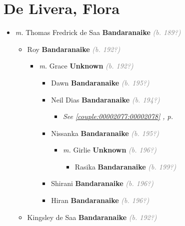 \documentclass[10pt, openany]{book}
\begin{document}
\chapter{De Livera, Flora}
\label{00002372}
\textcolor{slmaroon}{\textit{}}
\begin{itemize}
\item{\textit{m.} Thomas Fredrick de Saa \textbf{Bandaranaike} \textcolor{gray}{\textit{(b. 189?)}}   \label{couple:00002372:00002373} \begin{itemize}
\item{Roy \textbf{Bandaranaike} \textcolor{gray}{\textit{(b. 192?)}}
\begin{itemize}
\item{\textit{m.} Grace \textbf{Unknown} \textcolor{gray}{\textit{(b. 192?)}}   \label{couple:00002377:00002378} \begin{itemize}
\item{Dawn \textbf{Bandaranaike} \textcolor{gray}{\textit{(b. 195?)}}
 }
\item{Neil Dias \textbf{Bandaranaike} \textcolor{gray}{\textit{(b. 194?)}}
\begin{itemize}
\item{\textcolor{slteal}{\textit{See  \autoref{couple:00002077:00002078} \textit{, p. \pageref{couple:00002077:00002078} }}}}
\end{itemize}
  }
\item{Nissanka \textbf{Bandaranaike} \textcolor{gray}{\textit{(b. 195?)}}
\begin{itemize}
\item{\textit{m.} Girlie \textbf{Unknown} \textcolor{gray}{\textit{(b. 196?)}}   \label{couple:00002381:00002382} \begin{itemize}
\item{Rasika \textbf{Bandaranaike} \textcolor{gray}{\textit{(b. 199?)}}
 }
\end{itemize}}
\end{itemize}
 }
\item{Shirani \textbf{Bandaranaike} \textcolor{gray}{\textit{(b. 196?)}}
 }
\item{Hiran \textbf{Bandaranaike} \textcolor{gray}{\textit{(b. 196?)}}
 }
\end{itemize}}
\end{itemize}
 }
\item{Kingsley de Saa \textbf{Bandaranaike} \textcolor{gray}{\textit{(b. 192?)}}
}
\end{itemize}}
\end{itemize}
\end{document}

